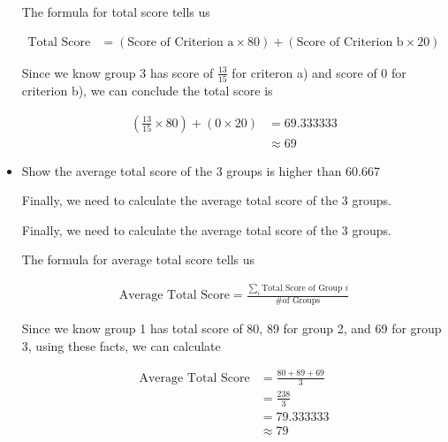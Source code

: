 \documentclass[12pt]{article}
\begin{document}
\begin{mdframed}
\begin{itemize}
\begin{mdframed}
            \bigskip

            The formula for total score tells us

            \begin{align}
                \text{Total Score} &= (\text{Score of Criterion a} \times 80) + (\text{Score of Criterion b} \times 20)
            \end{align}

            \bigskip

            Since we know group 3 has score of $\frac{13}{15}$ for criteron a) and score of $0$ for
            criterion b), we can conclude the total score is

            \begin{align}
                (\frac{13}{15} \times 80) + (0 \times 20) &= 69.333333\\
                &\approx 69
            \end{align}

        \end{mdframed}

        \item Show the average total score of the 3 groups is higher than
        60.667

        \bigskip

        Finally, we need to calculate the average total score of the 3 groups.

        \bigskip

        \begin{mdframed}
            Finally, we need to calculate the average total score of the 3 groups.

            \bigskip

            The formula for average total score tells us

            \begin{align}
                \text{Average Total Score} = \frac{\sum\limits_{i} \text{Total Score of Group } i}{\text{\# of Groups}}
            \end{align}

            \bigskip

            Since we know group 1 has total score of 80, 89 for group 2, and 69
            for group 3, using these facts, we can calculate

            \begin{align}
                \text{Average Total Score} &= \frac{80 + 89 + 69}{3}\\
                &= \frac{238}{3}\\
                &= 79.333333\\
                &\approx 79
            \end{align}
        \end{mdframed}
    \end{itemize}


\end{mdframed}
\end{document}
